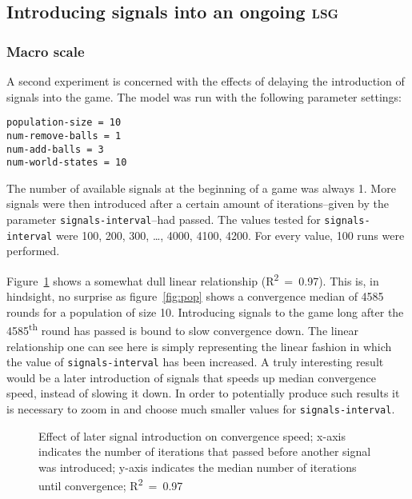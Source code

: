 \documentclass[
	DIV=calc,
	BCOR=0mm,
	pagesize,
]{scrartcl}
\newcommand{\code}[1]{\texttt{#1}}
\newcommand{\lsg}{\textsc{lsg}}
\newcommand{\dash}{–}
\begin{document}
\subsection{Introducing signals into an ongoing \lsg}
\label{ssec:resint}
\subsubsection*{Macro scale}
A second experiment is concerned with the effects of delaying the introduction of signals into the game. The model was run with the following parameter settings:
\begin{verbatim}
population-size = 10
num-remove-balls = 1
num-add-balls = 3
num-world-states = 10
\end{verbatim}
The number of available signals at the beginning of a game was always 1.
More signals were then introduced after a certain amount of iterations\dash given by the parameter \code{signals-interval}\dash had passed.
The values tested for \code{signals-interval} were 100, 200, 300, \ldots, 4000, 4100, 4200.
For every value, 100 runs were performed.

Figure~\ref{fig:sigmacro} shows a somewhat dull linear relationship (R\textsuperscript{2}~=~0.97).
This is, in hindsight, no surprise as figure~\ref{fig:pop} shows a convergence median of 4585 rounds for a population of size 10.
Introducing signals to the game long after the 4585\textsuperscript{th} round has passed is bound to slow convergence down.
The linear relationship one can see here is simply representing the linear fashion in which the value of \code{signals-interval} has been increased.
A truly interesting result would be a later introduction of signals that speeds up median convergence speed, instead of slowing it down.
In order to potentially produce such results it is necessary to zoom in and choose much smaller values for \code{signals-interval}.

\begin{figure}
	\centering
	\caption{Effect of later signal introduction on convergence speed; x-axis indicates the number of iterations that passed before another signal was introduced; y-axis indicates the median number of iterations until convergence; R\textsuperscript{2}~=~0.97}
	\label{fig:sigmacro}
\end{figure}
\end{document}
